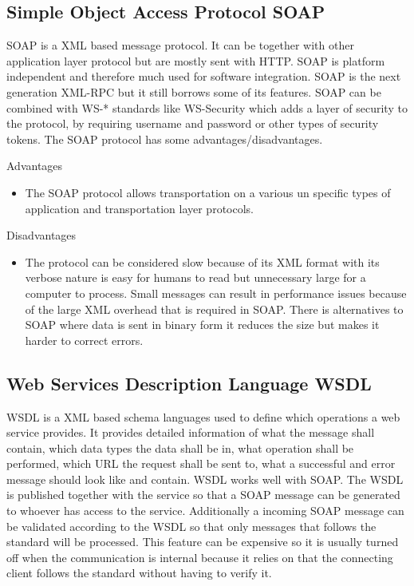 \documentclass{llncs}
\begin{document}
\subsection{Simple Object Access Protocol SOAP}
SOAP is a XML based message protocol. It can be together with other application layer protocol but are mostly sent with HTTP. SOAP is platform independent and therefore much used for software  integration. SOAP is the next generation XML-RPC but it still borrows some of its features. SOAP can be combined with WS-* standards like WS-Security which adds a layer of security to the protocol, by requiring username and password or other types of security tokens. The SOAP protocol has some advantages/disadvantages.

Advantages
\begin{itemize}
\item The SOAP protocol allows transportation on a various un specific types of application and transportation layer protocols.
\end{itemize}
Disadvantages
\begin{itemize}
\item The protocol can be considered slow because of its XML format with its verbose nature is easy for humans to read but unnecessary large for a computer to process. Small messages can result in performance issues because of the large XML overhead that is required in SOAP. There is alternatives to SOAP where data is sent in binary form it reduces the size but makes it harder to correct errors.
\end{itemize}


\subsection{Web Services Description Language WSDL}
WSDL is a XML based schema languages used to define which operations a web service provides. It provides detailed information of what the message shall contain, which data types the data shall be in, what operation shall be performed, which URL the request shall be sent to, what a successful and error message should look like and contain. WSDL works well with SOAP. The WSDL is published together with the service so that a SOAP message can be generated to whoever has access to the service. Additionally a incoming SOAP message can be validated according to the WSDL so that only messages that follows the standard will be processed. This feature can be expensive so it is usually turned off when the communication is internal because it relies on that the connecting client follows the standard without having to verify it.
\end{document}
